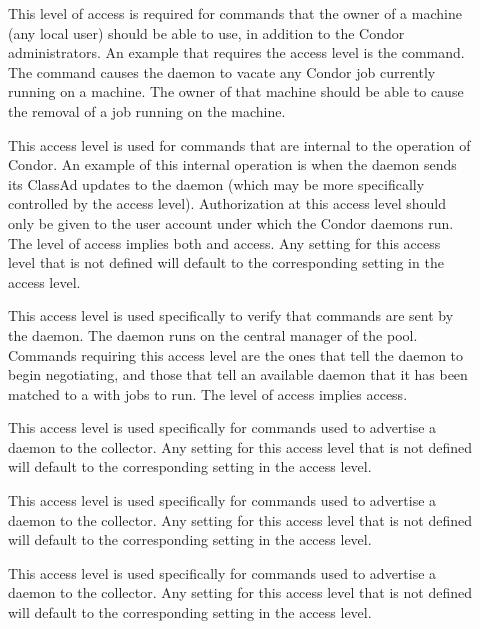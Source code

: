 \begin{description}
\item[] \label{sec-level-owner} This level of access is
   required for commands that the owner of a machine (any local user)
   should be able to use, in addition to the Condor administrators.
   An example that requires the  access level is
   the  command.
   The command causes the  daemon to vacate any
   Condor job currently running on a machine.
   The owner of that machine should be able to cause the removal
   of a job running on the machine.

\item[] \label{sec-level-daemon} This access level
   is used for commands that are internal to the operation of
   Condor.  An example of this internal operation is when the
    daemon sends
   its ClassAd updates to the  daemon (which may be
   more specifically controlled by the 
   access level).
   Authorization at this access level should only be given to
   the user account under which the Condor daemons run.
   The  level of access implies both
    and  access.  Any setting for this access
   level that is not defined will default to the corresponding setting
   in the  access level.

\item[] \label{sec-level-negotiator} This 
   access level is used specifically to verify that commands are
   sent by the  daemon.
   The  daemon runs on the central manager of
   the pool.
   Commands requiring this access
   level are the ones that tell the  daemon to begin
   negotiating, and those that tell an available  daemon
   that it has been matched to a  with jobs to run.
   The  level of access implies  access. 

\item[] \label{sec-level-advertise-master} This
   access level is used specifically for commands used to advertise a
    daemon to the collector.  Any setting for this access
   level that is not defined will default to the corresponding setting
   in the  access level.

\item[] \label{sec-level-advertise-master} This
   access level is used specifically for commands used to advertise a
    daemon to the collector.  Any setting for this access
   level that is not defined will default to the corresponding setting
   in the  access level.

\item[] \label{sec-level-advertise-master} This
   access level is used specifically for commands used to advertise a
    daemon to the collector.  Any setting for this access
   level that is not defined will default to the corresponding setting
   in the  access level.

\end{description}

